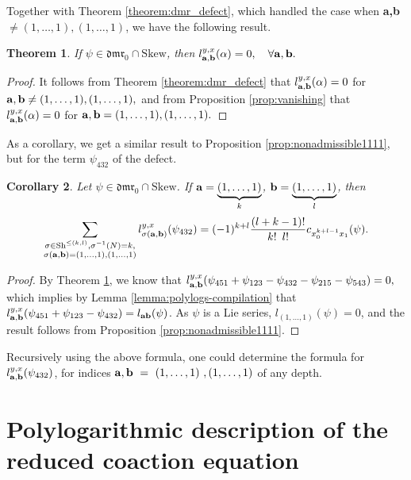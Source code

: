 \documentclass[a4paper,fleqn]{cas-sc}
\newtheorem{theorem}{Theorem}
\newtheorem{corollary}[theorem]{Corollary}
\begin{document}
Together with Theorem \ref{theorem:dmr_defect}, which handled the case when \textbf{a,b} $\neq (1,\ldots,1),(1,\ldots,1)$, we have the following result.
\begin{theorem}\label{th:defect_skew}
	If $\psi \in \mathfrak{dmr}_0\cap \mathrm{Skew}$, then %
	$
		l^{y,x}_{{\bf{a},\bf{b}}}(\alpha)=0,\quad \forall {\bf{a},\bf{b}}.
	$
\end{theorem}

\begin{proof}
It follows from Theorem \ref{theorem:dmr_defect} that 
$
l^{y,x}_{\bf{a},\bf{b}}(\alpha)=0$ for ${\bf{a},\bf{b}}\ne (1,\dots,1),(1,\dots,1),
$
and from Proposition \ref{prop:vanishing} that 
$l^{y,x}_{\bf{a},\bf{b}}(\alpha)=0$ for ${\bf{a},\bf{b}}= (1,\dots,1),(1,\dots,1).$
\end{proof}

As a corollary, we get a similar result to Proposition \ref{prop:nonadmissible1111}, but for the term $\psi_{432}$ of the defect.

\begin{corollary}
Let $\psi\in \mathfrak{dmr}_0\cap \mathrm{Skew}$. If ${\bf{a}}=\underbrace{(1,\dots,1)}_{k}$, ${\bf{b}}=\underbrace{(1,\dots,1)}_l$, then
	$$
		\sum_{
			\substack{
				\sigma\in \text{Sh}^{\le (k,l)},\sigma^{-1}(N)=k,\\
				\sigma({\bf{a},\bf{b}})=(1,\dots,1),(1,\dots,1)}} l^{y,x}_{\sigma({\bf{a},\bf{b}})}(\psi_{432})=(-1)^{k+l}\frac{(l+k-1)!}{k! \hspace{0.5em} l!}c_{x^{k+l-1}_0x_1}(\psi).
	$$
\end{corollary}

\begin{proof}
By Theorem \ref{th:defect_skew}, we know that
$
l^{y,x}_{\bf{a},\bf{b}}(\psi_{451}+\psi_{123}-\psi_{432}-\psi_{215}-\psi_{543})=0,
$
which implies by Lemma \ref{lemma:polylogs-compilation} that $l^{y,x}_{\bf{a},\bf{b}}(\psi_{451}+\psi_{123}-\psi_{432})=l_{\bf{a}\bf{b}}(\psi)$. As $\psi$ is a Lie series, $l_{(1, \ldots, 1)}(\psi) = 0$, and the result follows from Proposition \ref{prop:nonadmissible1111}.
\end{proof}


\begin{rmk}
	Recursively using the above formula, one could determine the formula for $l^{y,x}_{\bf{a},\bf{b}}(\psi_{432})$, for indices ${\bf{a,b}}~=~(1,\dots,1)~,(1,\dots,1)$ of any depth.
\end{rmk}

\section{Polylogarithmic description of the reduced coaction equation}
\label{sec:poly-descr-reduced-coaction}
\end{document}
